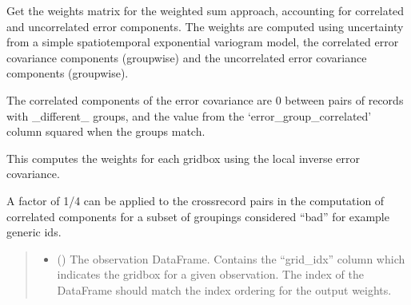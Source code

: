 \documentclass[letterpaper,10pt,english]{sphinxmanual}
\begin{document}
\begin{fulllineitems}
\label{\detokenize{error_covariance:glomar_gridding.error_covariance.weighted_sum}}
\pysigstartsignatures
\pysiglinewithargsret
{}
{\sphinxparamcomma {}\sphinxparamcomma {}\sphinxparamcomma {}\sphinxparamcomma {}\sphinxparamcomma {}\sphinxparamcomma {}\sphinxparamcomma {}\sphinxparamcomma {}\sphinxparamcomma {}\sphinxparamcomma {}\sphinxparamcomma {}}
{}
\pysigstopsignatures
\sphinxAtStartPar
Get the weights matrix for the weighted sum approach, accounting for
correlated and uncorrelated error components. The weights are computed using
uncertainty from a simple spatio\sphinxhyphen{}temporal exponential variogram model, the
correlated error covariance components (group\sphinxhyphen{}wise) and the uncorrelated
error covariance components (group\sphinxhyphen{}wise).

\sphinxAtStartPar
The correlated components of the error covariance are 0 between pairs of
records with \_different\_ groups, and the value from the
‘error\_group\_correlated’ column squared when the groups match.

\sphinxAtStartPar
This computes the weights for each grid\sphinxhyphen{}box using the local inverse error
covariance.

\sphinxAtStartPar
A factor of 1/4 can be applied to the cross\sphinxhyphen{}record pairs in the computation
of correlated components for a subset of groupings considered “bad” \sphinxhyphen{} for
example generic ids.
\begin{quote}\begin{description}
\begin{itemize}
\item {}
\sphinxAtStartPar
{} () \textendash{} The observation DataFrame. Contains the “grid\_idx” column which
indicates the gridbox for a given observation. The index of the
DataFrame should match the index ordering for the output weights.


\end{itemize}
\end{description}
\end{quote}
\end{fulllineitems}
\end{document}
